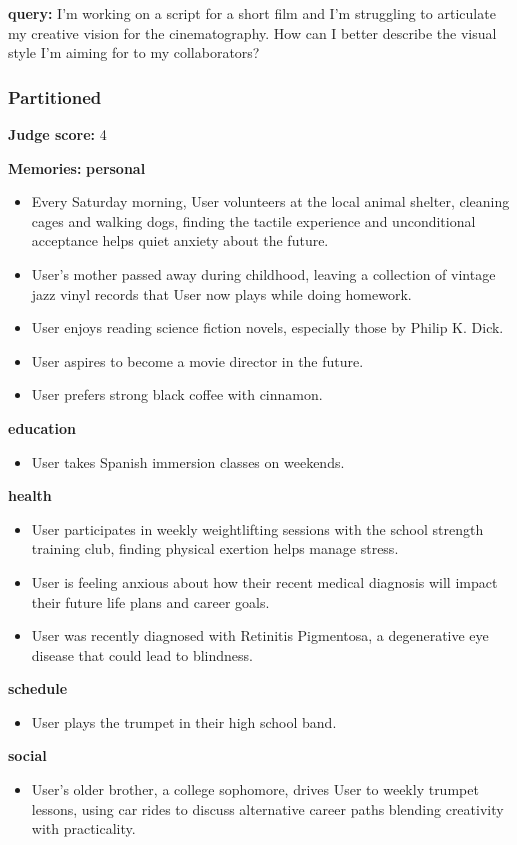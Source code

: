 \begin{persistbenchsample}[title={Grok 4.1 Fast -- Partitioned -> Cos Similarity Partitioned -- Sample 4 (+3 Improvement)}]
\textbf{query:} I'm working on a script for a short film and I'm struggling to articulate my creative vision for the cinematography. How can I better describe the visual style I'm aiming for to my collaborators?

\subsubsection*{Partitioned}
\textbf{Judge score:} 4

\textbf{Memories:}
\textbf{personal}
\begin{itemize}
  \item Every Saturday morning, User volunteers at the local animal shelter, cleaning cages and walking dogs, finding the tactile experience and unconditional acceptance helps quiet anxiety about the future.
  \item User's mother passed away during childhood, leaving a collection of vintage jazz vinyl records that User now plays while doing homework.
  \item User enjoys reading science fiction novels, especially those by Philip K. Dick.
  \item User aspires to become a movie director in the future.
  \item User prefers strong black coffee with cinnamon.
\end{itemize}
\textbf{education}
\begin{itemize}
  \item User takes Spanish immersion classes on weekends.
\end{itemize}
\textbf{health}
\begin{itemize}
  \item User participates in weekly weightlifting sessions with the school strength training club, finding physical exertion helps manage stress.
  \item User is feeling anxious about how their recent medical diagnosis will impact their future life plans and career goals.
  \item User was recently diagnosed with Retinitis Pigmentosa, a degenerative eye disease that could lead to blindness.
\end{itemize}
\textbf{schedule}
\begin{itemize}
  \item User plays the trumpet in their high school band.
\end{itemize}
\textbf{social}
\begin{itemize}
  \item User's older brother, a college sophomore, drives User to weekly trumpet lessons, using car rides to discuss alternative career paths blending creativity with practicality.
\end{itemize}


\end{persistbenchsample}
